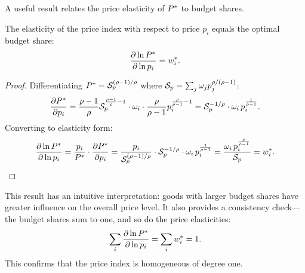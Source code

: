 A useful result relates the price elasticity of $P^{*}$ to budget shares.

\begin{proposition}
\label{prop:price-elasticity}
The elasticity of the price index with respect to price $p_i$ equals the optimal budget share:
\begin{equation}
\frac{\partial \ln P^{*}}{\partial \ln p_i} = w_i^*.
\end{equation}
\end{proposition}

\begin{proof}
Differentiating $P^{*} = \mathcal{S}_p^{(\rho-1)/\rho}$ where $\mathcal{S}_p = \sum_j \omega_j p_j^{\rho/(\rho-1)}$:
\[
\frac{\partial P^{*}}{\partial p_i} = \frac{\rho-1}{\rho} \mathcal{S}_p^{\frac{\rho-1}{\rho} - 1} \cdot \omega_i \cdot \frac{\rho}{\rho-1} p_i^{\frac{\rho}{\rho-1} - 1} = \mathcal{S}_p^{-1/\rho} \cdot \omega_i \, p_i^{\frac{1}{\rho-1}}.
\]
Converting to elasticity form:
\[
\frac{\partial \ln P^{*}}{\partial \ln p_i} = \frac{p_i}{P^{*}} \cdot \frac{\partial P^{*}}{\partial p_i} = \frac{p_i}{\mathcal{S}_p^{(\rho-1)/\rho}} \cdot \mathcal{S}_p^{-1/\rho} \cdot \omega_i \, p_i^{\frac{1}{\rho-1}} = \frac{\omega_i \, p_i^{\frac{\rho}{\rho-1}}}{\mathcal{S}_p} = w_i^*.
\]
\end{proof}

This result has an intuitive interpretation: goods with larger budget shares have greater influence on the overall price level. It also provides a consistency check---the budget shares sum to one, and so do the price elasticities:
\[
\sum_i \frac{\partial \ln P^{*}}{\partial \ln p_i} = \sum_i w_i^* = 1.
\]
This confirms that the price index is homogeneous of degree one.
